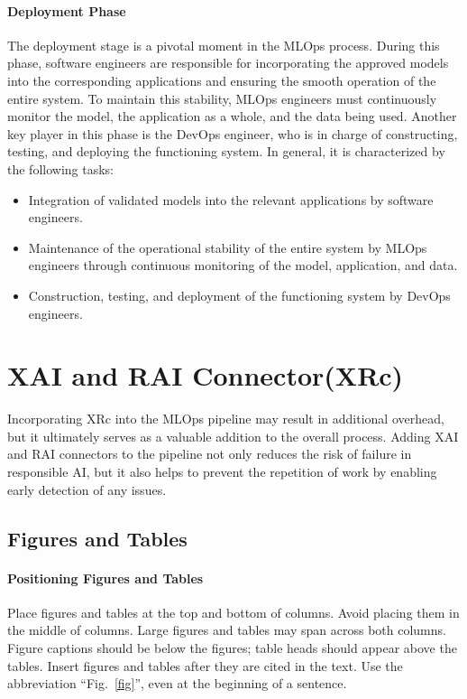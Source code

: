 \documentclass[conference]{IEEEtran}
\begin{document}
\paragraph{Deployment Phase} The deployment stage is a pivotal moment in the MLOps process. During this phase, software engineers are responsible for incorporating the approved models into the corresponding applications and ensuring the smooth operation of the entire system. To maintain this stability, MLOps engineers must continuously monitor the model, the application as a whole, and the data being used. Another key player in this phase is the DevOps engineer, who is in charge of constructing, testing, and deploying the functioning system. In general, it is characterized by the following tasks:
\begin{itemize}
	\item Integration of validated models into the relevant applications by software engineers.
	\item Maintenance of the operational stability of the entire system by MLOps engineers through continuous monitoring of the model, application, and data.
	\item Construction, testing, and deployment of the functioning system by DevOps engineers.
\end{itemize}

\section{XAI and RAI Connector(XRc)}
Incorporating XRc into the MLOps pipeline may result in additional overhead, but it ultimately serves as a valuable addition to the overall process. Adding XAI and RAI connectors to the pipeline not only reduces the risk of failure in responsible AI, but it also helps to prevent the repetition of work by enabling early detection of any issues.

\subsection{Figures and Tables}
\paragraph{Positioning Figures and Tables} Place figures and tables at the top and 
bottom of columns. Avoid placing them in the middle of columns. Large 
figures and tables may span across both columns. Figure captions should be 
below the figures; table heads should appear above the tables. Insert 
figures and tables after they are cited in the text. Use the abbreviation 
``Fig.~\ref{fig}'', even at the beginning of a sentence.
\end{document}
